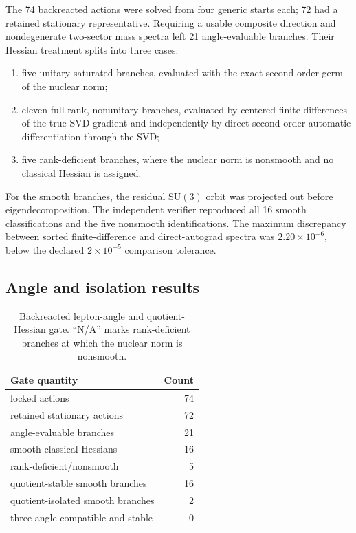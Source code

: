 \documentclass[11pt]{article}
\newcommand{\SU}{\mathrm{SU}}
\begin{document}
The 74 backreacted actions were solved from four generic starts each; 72 had a retained stationary representative.  Requiring a usable composite direction and nondegenerate two-sector mass spectra left 21 angle-evaluable branches.  Their Hessian treatment splits into three cases:
\begin{enumerate}[leftmargin=2.1em]
  \item five unitary-saturated branches, evaluated with the exact second-order germ of the nuclear norm;
  \item eleven full-rank, nonunitary branches, evaluated by centered finite differences of the true-SVD gradient and independently by direct second-order automatic differentiation through the SVD;
  \item five rank-deficient branches, where the nuclear norm is nonsmooth and no classical Hessian is assigned.
\end{enumerate}
For the smooth branches, the residual $\SU(3)$ orbit was projected out before eigendecomposition.  The independent verifier reproduced all 16 smooth classifications and the five nonsmooth identifications.  The maximum discrepancy between sorted finite-difference and direct-autograd spectra was $2.20\times10^{-6}$, below the declared $2\times10^{-5}$ comparison tolerance.

\subsection{Angle and isolation results}

\begin{table}[t]
\centering
\caption{Backreacted lepton-angle and quotient-Hessian gate.  ``N/A'' marks rank-deficient branches at which the nuclear norm is nonsmooth.}
\label{tab:link-counts}
\begin{tabular}{@{}lr@{}}
\toprule
Gate quantity & Count \\
\midrule
locked actions & 74 \\
retained stationary actions & 72 \\
angle-evaluable branches & 21 \\
smooth classical Hessians & 16 \\
rank-deficient/nonsmooth & 5 \\
quotient-stable smooth branches & 16 \\
quotient-isolated smooth branches & 2 \\
three-angle-compatible and stable & 0 \\
\bottomrule
\end{tabular}
\end{table}
\end{document}
